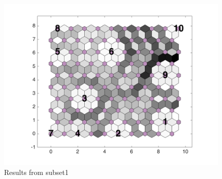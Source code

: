 \begin{figure}
        \centering
        \includegraphics[width=\textwidth]{../../images0.01/M31/2D/image_subsets/subset1_dist_with_hits_t.png}
    \caption{Results from subset1}
    \label{fig: subset1}
\end{figure}